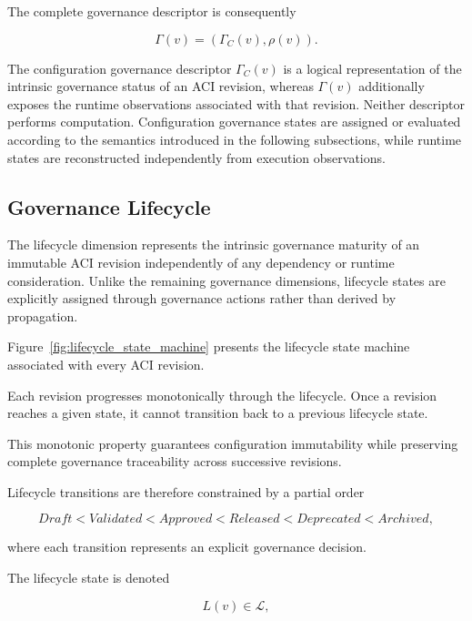 \documentclass[10pt]{article}
\begin{document}
The complete governance descriptor is consequently

\begin{equation}
	\Gamma(v)
	=
	\left(
	\Gamma_C(v),
	\rho(v)
	\right).
	\label{eq:complete_governance_descriptor}
\end{equation}


The configuration governance descriptor $\Gamma_C(v)$ is a logical
representation of the intrinsic governance status of an ACI revision, whereas $\Gamma(v)$ additionally exposes the runtime observations associated with that revision. Neither descriptor performs computation. Configuration governance states are assigned or evaluated according to the semantics introduced in the following subsections, while runtime states are reconstructed independently from execution observations.

\subsection{Governance Lifecycle}
\label{sec:lifecycle_semantics}

The lifecycle dimension represents the intrinsic governance maturity of an immutable ACI revision independently of any dependency or runtime consideration. Unlike the remaining governance dimensions, lifecycle states are explicitly assigned through governance actions rather than derived by propagation.

Figure~\ref{fig:lifecycle_state_machine} presents the lifecycle state machine associated with every ACI revision.

Each revision progresses monotonically through the lifecycle. Once a revision reaches a given state, it cannot transition back to a previous lifecycle state.

This monotonic property guarantees configuration immutability while preserving complete governance traceability across successive revisions.

Lifecycle transitions are therefore constrained by a partial order

\begin{equation}
	Draft
	<
	Validated
	<
	Approved
	<
	Released
	<
	Deprecated
	<
	Archived,
	\label{eq:lifecycle_order}
\end{equation}

where each transition represents an explicit governance decision.

The lifecycle state is denoted

\begin{equation}
	L(v)\in\mathcal{L},
	\label{eq:lifecycle_state}
\end{equation}
\end{document}
